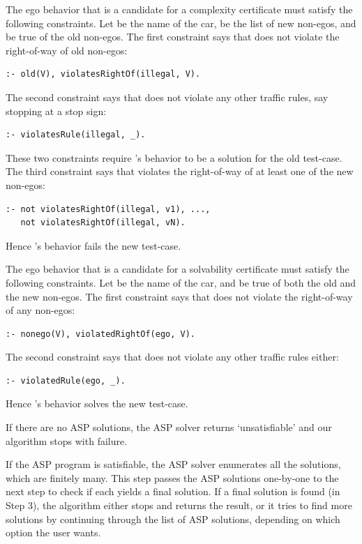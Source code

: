 The ego behavior that is a candidate for a complexity certificate must satisfy the following constraints.
%
Let  be the name of the car,  be the list of new non-egos, and  be true of the old non-egos.
%
The first constraint says that  does not violate the right-of-way of old non-egos:
\begin{verbatim}
:- old(V), violatesRightOf(illegal, V).
\end{verbatim}
%
The second constraint says that  does not violate any other traffic rules, say stopping at a stop sign:
\begin{verbatim}
:- violatesRule(illegal, _).
\end{verbatim}
%
These two constraints require 's behavior to be a solution for the old test-case.
%
The third constraint says that  violates the right-of-way of at least one of the new non-egos:
\begin{verbatim}
:- not violatesRightOf(illegal, v1), ..., 
   not violatesRightOf(illegal, vN).
\end{verbatim}
%
Hence 's behavior fails the new test-case.


The ego behavior that is a candidate for a solvability certificate must satisfy the following constraints.
%
Let  be the name of the car, and  be true of both the old and the new non-egos.
%
The first constraint says that  does not violate the right-of-way of any non-egos:
\begin{verbatim}
:- nonego(V), violatedRightOf(ego, V).
\end{verbatim}
%
The second constraint says that  does not violate any other traffic rules either:
\begin{verbatim}
:- violatedRule(ego, _).
\end{verbatim}
%
Hence 's behavior solves the new test-case.


If there are no ASP solutions, the ASP solver returns `unsatisfiable' and our algorithm stops with failure.

If the ASP program is satisfiable, the ASP solver enumerates all the solutions, which are finitely many.
%
This step passes the ASP solutions one-by-one to the next step to check if each yields a final solution.
%
If a final solution is found (in Step 3), the algorithm either stops and returns the result, or it tries to find more solutions by continuing through the list of ASP solutions, depending on which option the user wants.



